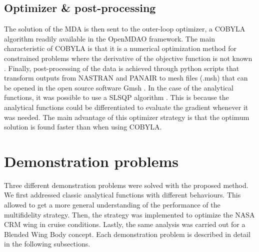 \documentclass[conf]{new-aiaa}
\begin{document}
\subsection{Optimizer \& post-processing}
The solution of the MDA is then sent to the outer-loop optimizer, a COBYLA algorithm readily available in the OpenMDAO framework.  The main characteristic of COBYLA is that it is a numerical optimization method for constrained problems where the derivative of the objective function is not known \cite{powell1994direct}. Finally, post-processing of the data is achieved through python scripts that transform outputs from NASTRAN and PANAIR to mesh files (.msh) that can be opened in the open source software Gmsh \cite{geuzaine2009gmsh}. 
In the case of the analytical functions, it was possible to use a SLSQP algorithm \cite{kraft1989slsqp}. This is because the analytical functions could be differentiated to evaluate the gradient whenever it was needed. The main advantage of this optimizer strategy is that the optimum solution is found faster than when using COBYLA.   

\section{Demonstration problems}
\label{sec:Demonstration}
Three different demonstration problems were solved with the proposed method. We first addressed classic analytical functions with different behaviours. This allowed to get a more general understanding of the performance of the multifidelity strategy.  Then, the strategy was implemented to optimize the NASA CRM wing in cruise conditions. Lastly, the same analysis was carried out for a Blended Wing Body concept. Each demonstration problem is described in detail in the following subsections. 
\end{document}
